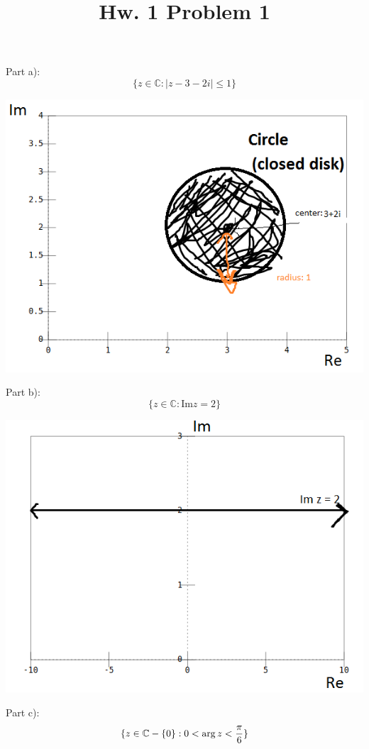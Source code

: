 \documentclass[12pt]{article}
\newcommand{\C}{\mathbb{C}}
\renewcommand{\Im}{\text{Im}}
\begin{document}
\title{Hw. 1 Problem 1}
\maketitle

Part a): 
$$\{z\in\C: |z-3-2i|\le1\}$$

\includegraphics[scale=0.9]{q1a}

\newpage

Part b): 
$$\{z\in\C: \Im z =2\}$$

\includegraphics[scale=0.9]{q1b}

\newpage
Part c): 
$$\{z\in\C-\{0\}: 0<\arg z< {\pi\over6}\}$$
\end{document}
